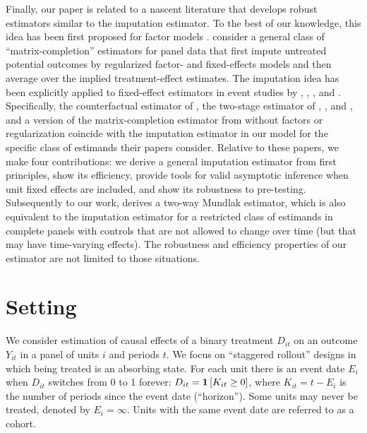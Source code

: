 \documentclass[english,11pt]{article}
\theoremstyle{plain}
\theoremstyle{plain}
\theoremstyle{plain}
\theoremstyle{plain}
\begin{document}
Finally, our paper is related to a nascent literature that develops
robust estimators similar to the imputation estimator. To the best
of our knowledge, this idea has been first proposed for factor models
\parencite{Gobillon2016a,Xu2017}. \textcite{Athey2018b} consider
a general class of ``matrix-completion'' estimators for panel data
that first impute untreated potential outcomes by regularized factor-
and fixed-effects models and then average over the implied treatment-effect
estimates. The imputation idea has been explicitly applied to fixed-effect
estimators in event studies by \textcite{Liu2020a}, \textcite{Gardner2020a}, \textcite{Thakral2020}, and \textcite{thakral2023two}.
Specifically, the counterfactual estimator of \textcite{Liu2020a},
the two-stage estimator of \textcite{Gardner2020a}, \textcite{Thakral2020}, and \textcite{thakral2023two}, and a version
of the matrix-completion estimator from \textcite{Athey2018b} without
factors or regularization coincide with the imputation estimator in
our model for the specific class of estimands their papers consider.
Relative to these papers, we make four contributions: we derive a general imputation estimator from first principles, show its efficiency,
provide tools for valid asymptotic inference when unit fixed effects
are included, and show its robustness to pre-testing. Subsequently
to our work, \textcite{Wooldridge2021} derives a two-way Mundlak
estimator, which is also equivalent to the imputation estimator for
a restricted class of estimands in complete panels with controls that
are not allowed to change over time (but that may have time-varying
effects). The robustness and efficiency properties of our estimator
are not limited to those situations.

\section{Setting\label{sec:Setting}}

We consider estimation of causal effects of a binary treatment $D_{it}$
on an outcome $Y_{it}$ in a panel of units $i$ and periods $t$.
We focus on ``staggered rollout'' designs in which being treated
is an absorbing state. For each unit there is an event date $E_{i}$
when $D_{it}$ switches from 0 to 1 forever: $D_{it}=\mathbf{1}\left[K_{it}\ge0\right]$,
where $K_{it}=t-E_{i}$ is the number of periods since the event date
(``horizon''). Some units may never be treated, denoted by $E_{i}=\infty$.
Units with the same event date are referred to as a cohort.
\end{document}

